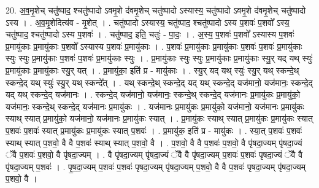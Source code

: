 \documentclass[17pt]{extarticle}
\begin{document}
20. अ॒व॒मृ॒शेच् चतु॑ष्पाद॒ श्चतु॑ष्पादो ऽवमृ॒शे द॑वमृ॒शेच् चतु॑ष्पादो ऽस्यास्य॒ चतु॑ष्पादो ऽवमृ॒शे द॑वमृ॒शेच् चतु॑ष्पादो ऽस्य । . अ॒व॒मृ॒शेदित्य॑व - मृ॒शेत् । . चतु॑ष्पादो ऽस्यास्य॒ चतु॑ष्पाद॒ श्चतु॑ष्पादो ऽस्य प॒शवः॑ प॒शवो᳚ ऽस्य॒ चतु॑ष्पाद॒ श्चतु॑ष्पादो ऽस्य प॒शवः॑ । . चतु॑ष्पाद॒ इति॒ चतुः॑ - पा॒दः॒ । . अ॒स्य॒ प॒शवः॑ प॒शवो᳚ ऽस्यास्य प॒शवः॑ प्र॒मायु॑काः प्र॒मायु॑काः प॒शवो᳚ ऽस्यास्य प॒शवः॑ प्र॒मायु॑काः । . प॒शवः॑ प्र॒मायु॑काः प्र॒मायु॑काः प॒शवः॑ प॒शवः॑ प्र॒मायु॑काः स्युः स्युः प्र॒मायु॑काः प॒शवः॑ प॒शवः॑ प्र॒मायु॑काः स्युः । . प्र॒मायु॑काः स्युः स्युः प्र॒मायु॑काः प्र॒मायु॑काः स्यु॒र् यद् यथ् स्युः॑ प्र॒मायु॑काः प्र॒मायु॑काः स्यु॒र् यत् । . प्र॒मायु॑का॒ इति॑ प्र - मायु॑काः । . स्यु॒र् यद् यथ् स्युः॑ स्यु॒र् यथ् स्कन्दे॒थ् स्कन्दे॒द् यथ् स्युः॑ स्यु॒र् यथ् स्कन्दे᳚त् । . यथ् स्कन्दे॒थ् स्कन्दे॒द् यद् यथ् स्कन्दे॒द् यज॑मानो॒ यज॑मानः॒ स्कन्दे॒द् यद् यथ् स्कन्दे॒द् यज॑मानः । . स्कन्दे॒द् यज॑मानो॒ यज॑मानः॒ स्कन्दे॒थ् स्कन्दे॒द् यज॑मानः प्र॒मायु॑कः प्र॒मायु॑को॒ यज॑मानः॒ स्कन्दे॒थ् स्कन्दे॒द् यज॑मानः प्र॒मायु॑कः । . यज॑मानः प्र॒मायु॑कः प्र॒मायु॑को॒ यज॑मानो॒ यज॑मानः प्र॒मायु॑कः स्याथ् स्यात् प्र॒मायु॑को॒ यज॑मानो॒ यज॑मानः प्र॒मायु॑कः स्यात् । . प्र॒मायु॑कः स्याथ् स्यात् प्र॒मायु॑कः प्र॒मायु॑कः स्यात् प॒शवः॑ प॒शवः॑ स्यात् प्र॒मायु॑कः प्र॒मायु॑कः स्यात् प॒शवः॑ । . प्र॒मायु॑क॒ इति॑ प्र - मायु॑कः । . स्या॒त् प॒शवः॑ प॒शवः॑ स्याथ् स्यात् प॒शवो॒ वै वै प॒शवः॑ स्याथ् स्यात् प॒शवो॒ वै । . प॒शवो॒ वै वै प॒शवः॑ प॒शवो॒ वै पृ॑षदा॒ज्यम् पृ॑षदा॒ज्यं ॅवै प॒शवः॑ प॒शवो॒ वै पृ॑षदा॒ज्यम् । . वै पृ॑षदा॒ज्यम् पृ॑षदा॒ज्यं ॅवै वै पृ॑षदा॒ज्यम् प॒शवः॑ प॒शवः॑ पृषदा॒ज्यं ॅवै वै पृ॑षदा॒ज्यम् प॒शवः॑ । . पृ॒ष॒दा॒ज्यम् प॒शवः॑ प॒शवः॑ पृषदा॒ज्यम् पृ॑षदा॒ज्यम् प॒शवो॒ वै वै प॒शवः॑ पृषदा॒ज्यम् पृ॑षदा॒ज्यम् प॒शवो॒ वै । \newline
\end{document}

